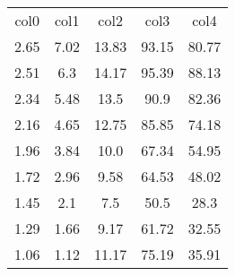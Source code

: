 \begin{table}
\begin{tabular}{ccccc}
col0 & col1 & col2 & col3 & col4 \\
2.65 & 7.02 & 13.83 & 93.15 & 80.77 \\
2.51 & 6.3 & 14.17 & 95.39 & 88.13 \\
2.34 & 5.48 & 13.5 & 90.9 & 82.36 \\
2.16 & 4.65 & 12.75 & 85.85 & 74.18 \\
1.96 & 3.84 & 10.0 & 67.34 & 54.95 \\
1.72 & 2.96 & 9.58 & 64.53 & 48.02 \\
1.45 & 2.1 & 7.5 & 50.5 & 28.3 \\
1.29 & 1.66 & 9.17 & 61.72 & 32.55 \\
1.06 & 1.12 & 11.17 & 75.19 & 35.91 \\
\end{tabular}
\end{table}
